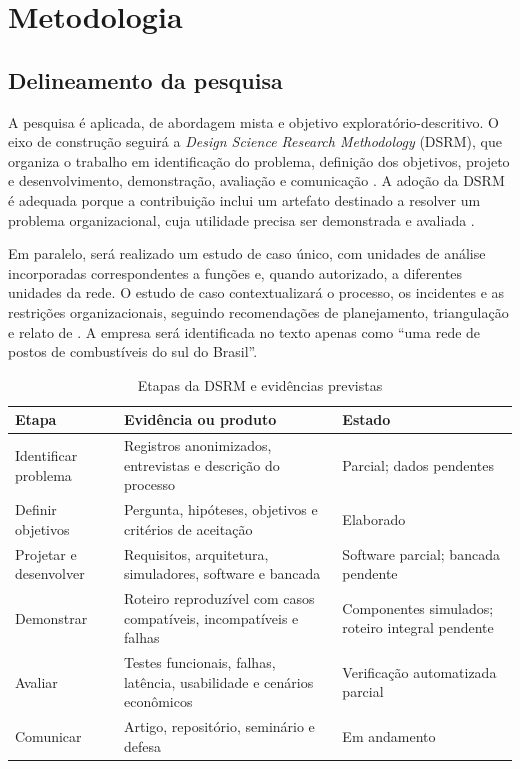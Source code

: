 \section{Metodologia}
\label{sec:metodologia}

\subsection{Delineamento da pesquisa}

A pesquisa é aplicada, de abordagem mista e objetivo exploratório-descritivo.
O eixo de construção seguirá a \textit{Design Science Research Methodology}
(DSRM), que organiza o trabalho em identificação do problema, definição dos
objetivos, projeto e desenvolvimento, demonstração, avaliação e comunicação
\cite{peffersEtAl2007}. A adoção da DSRM é adequada porque a contribuição inclui
um artefato destinado a resolver um problema organizacional, cuja utilidade
precisa ser demonstrada e avaliada \cite{hevnerEtAl2004}.

Em paralelo, será realizado um estudo de caso único, com unidades de análise
incorporadas correspondentes a funções e, quando autorizado, a diferentes
unidades da rede. O estudo de caso contextualizará o processo, os incidentes e
as restrições organizacionais, seguindo recomendações de planejamento,
triangulação e relato de \cite{runesonHost2009}. A empresa será identificada no
texto apenas como ``uma rede de postos de combustíveis do sul do Brasil''.

\begin{table}[H]
  \centering
  \caption{Etapas da DSRM e evidências previstas}
  \label{tab:dsrm}
  \small
  \begin{tabularx}{\textwidth}{@{}L{3.1cm}YL{2.5cm}@{}}
    \toprule
    \textbf{Etapa} & \textbf{Evidência ou produto} & \textbf{Estado} \\
    \midrule
    Identificar problema & Registros anonimizados, entrevistas e descrição do processo & Parcial; dados pendentes \\
    Definir objetivos & Pergunta, hipóteses, objetivos e critérios de aceitação & Elaborado \\
    Projetar e desenvolver & Requisitos, arquitetura, simuladores, software e bancada & Software parcial; bancada pendente \\
    Demonstrar & Roteiro reproduzível com casos compatíveis, incompatíveis e falhas & Componentes simulados; roteiro integral pendente \\
    Avaliar & Testes funcionais, falhas, latência, usabilidade e cenários econômicos & Verificação automatizada parcial \\
    Comunicar & Artigo, repositório, seminário e defesa & Em andamento \\
    \bottomrule
  \end{tabularx}
  \\[2pt]\fontepropria
\end{table}

